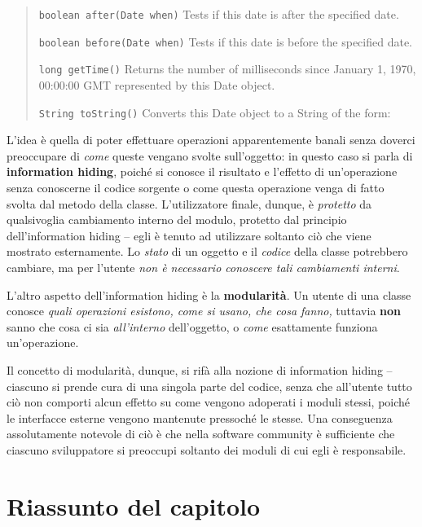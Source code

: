 \documentclass[\fontsizeclass,twocolumn]{\classname}
\theoremstyle{definition}
\theoremstyle{definition}
\begin{document}
\begin{quote}
\footnotesize{
    \texttt{boolean	after(Date when)}	Tests if this date is after the specified date.

    \texttt{boolean	before(Date when)}	Tests if this date is before the specified date.

    \texttt{long	getTime()}	Returns the number of milliseconds since January 1,
1970, 00:00:00 GMT represented by this Date object.

\texttt{String	toString()}	Converts this Date object to a String of the form:
}
\end{quote}

L'idea è quella di poter effettuare operazioni apparentemente banali senza
doverci preoccupare di \emph{come} queste vengano svolte sull'oggetto: in
questo caso si parla di \textbf{information hiding}, poiché si conosce il
risultato e l'effetto di un'operazione senza conoscerne il codice sorgente o
come questa operazione venga di fatto svolta dal metodo della classe.
L'utilizzatore finale, dunque, è \emph{protetto} da qualsivoglia cambiamento
interno del modulo, protetto dal principio dell'information hiding \--- egli è
tenuto ad utilizzare soltanto ciò che viene mostrato esternamente. Lo
\emph{stato} di un oggetto e il \emph{codice} della classe potrebbero cambiare,
ma per l'utente \emph{non è necessario conoscere tali cambiamenti interni}.

L'altro aspetto dell'information hiding è la \textbf{modularità}. Un utente di
una classe conosce \emph{quali operazioni esistono, come si usano, che cosa
fanno,} tuttavia \textbf{non} sanno che cosa ci sia \emph{all'interno}
dell'oggetto, o \emph{come} esattamente funziona un'operazione.

Il concetto di modularità, dunque, si rifà alla nozione di information hiding
\--- ciascuno si prende cura di una singola parte del codice, senza che
all'utente tutto ciò non comporti alcun effetto su come vengono adoperati i
moduli stessi, poiché le interfacce esterne vengono mantenute pressoché le
stesse. Una conseguenza assolutamente notevole di ciò è che nella software
community è sufficiente che ciascuno sviluppatore si preoccupi soltanto dei
moduli di cui egli è responsabile.

\section{Riassunto del capitolo}
\end{document}
